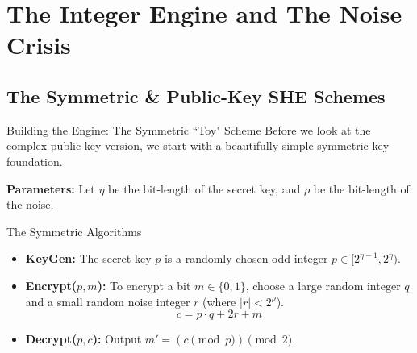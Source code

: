 \documentclass[10pt,handout]{beamer}
\begin{document}
\section{The Integer Engine and The Noise Crisis}
\subsection{The Symmetric \& Public-Key SHE Schemes}

\begin{frame}{Building the Engine: The Symmetric ``Toy" Scheme}
    Before we look at the complex public-key version, we start with a beautifully simple symmetric-key foundation.
    \pause
    
    \vspace{0.3cm}
    \textbf{Parameters:} Let $\eta$ be the bit-length of the secret key, and $\rho$ be the bit-length of the noise.
    \pause
    
    \begin{block}{The Symmetric Algorithms}
    \begin{itemize}
        \item \textbf{KeyGen:} The secret key $p$ is a randomly chosen odd integer $p \in [2^{\eta-1}, 2^{\eta})$.
        \item \textbf{Encrypt($p, m$):} To encrypt a bit $m \in \{0,1\}$, choose a large random integer $q$ and a small random noise integer $r$ (where $|r| < 2^{\rho}$). 
        $$c = p \cdot q + 2r + m$$
        \item \textbf{Decrypt($p, c$):} Output $m' = (c \pmod p) \pmod 2$.
    \end{itemize}
    \end{block}
\end{frame}
\end{document}
